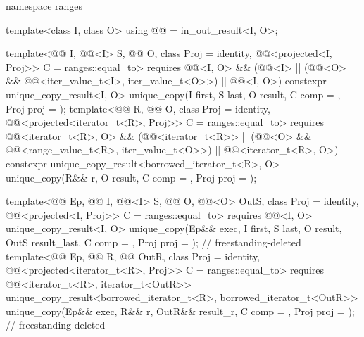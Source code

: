 \begin{codeblock}
{  namespace ranges {
    template<class I, class O>
      using @@ = in_out_result<I, O>;

    template<@@ I, @@<I> S, @@ O, class Proj = identity,
             @@<projected<I, Proj>> C = ranges::equal_to>
      requires @@<I, O> &&
               (@@<I> ||
                (@@<O> && @@<iter_value_t<I>, iter_value_t<O>>) ||
                @@<I, O>)
      constexpr unique_copy_result<I, O>
        unique_copy(I first, S last, O result, C comp = {}, Proj proj = {});
    template<@@ R, @@ O, class Proj = identity,
             @@<projected<iterator_t<R>, Proj>> C = ranges::equal_to>
      requires @@<iterator_t<R>, O> &&
               (@@<iterator_t<R>> ||
                (@@<O> && @@<range_value_t<R>, iter_value_t<O>>) ||
                @@<iterator_t<R>, O>)
      constexpr unique_copy_result<borrowed_iterator_t<R>, O>
        unique_copy(R&& r, O result, C comp = {}, Proj proj = {});

    template<@@ Ep, @@ I, @@<I> S,
             @@ O, @@<O> OutS, class Proj = identity,
             @@<projected<I, Proj>> C = ranges::equal_to>
      requires @@<I, O>
      unique_copy_result<I, O>
        unique_copy(Ep&& exec, I first, S last, O result, OutS result_last, C comp = {},
                    Proj proj = {});                            // freestanding-deleted
    template<@@ Ep, @@ R, @@ OutR,
             class Proj = identity,
             @@<projected<iterator_t<R>, Proj>> C = ranges::equal_to>
      requires @@<iterator_t<R>, iterator_t<OutR>>
      unique_copy_result<borrowed_iterator_t<R>, borrowed_iterator_t<OutR>>
        unique_copy(Ep&& exec, R&& r, OutR&& result_r, C comp = {},
                    Proj proj = {});                            // freestanding-deleted
  }

}
\end{codeblock}

